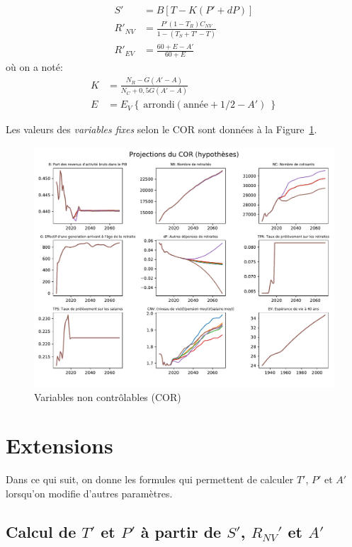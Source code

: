 \documentclass[10pt]{article}
\begin{document}
  \begin{align}
    S' &=  B [T-K(P'+dP)]\\
    R'_{NV} & = \frac{P' (1-T_R)C_{NV}}{1-(T_S+T'-T)}\\
    R'_{EV} & = \frac{ 60 + E -A' }{ 60 + E }
    \end{align}
  où on a noté:
  \begin{align}
    K & = \frac{N_R-G(A'-A)}{N_C+0,5G(A'-A)} \\
    E & = E_V \left\{~\mbox{arrondi}(\mbox{année}+1/2-A')~ \right\}
  \end{align}

  Les valeurs des \emph{variables fixes} selon le COR sont données à la Figure~\ref{conj}.
  \begin{figure}
    \includegraphics[width=20cm,angle=90]{conjoncture}
    \caption{\label{conj} Variables non contrôlables (COR)}
\end{figure}
  
  \section{Extensions}

  Dans ce qui suit, on donne les formules qui permettent de calculer $T'$, $P'$ et $A'$ lorsqu'on modifie d'autres paramètres.

  \subsection{Calcul de $T'$ et $P'$ à partir de $S'$, $R_{NV}'$ et $A'$}
\end{document}
